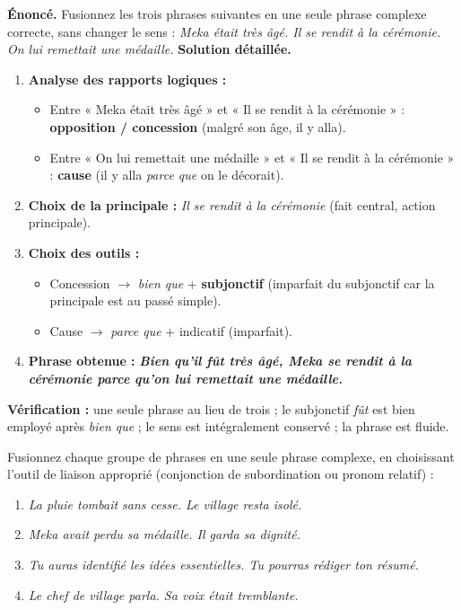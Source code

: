 \documentclass[11pt]{article}
\begin{document}
\begin{exoresolu}
\textbf{Énoncé.} Fusionnez les trois phrases suivantes en une seule phrase complexe correcte, sans changer le sens : \emph{Meka était très âgé. Il se rendit à la cérémonie. On lui remettait une médaille.}
\tcblower
\textbf{Solution détaillée.}
\begin{enumerate}
\item \textbf{Analyse des rapports logiques :}
\begin{itemize}
\item Entre « Meka était très âgé » et « Il se rendit à la cérémonie » : \textbf{opposition / concession} (malgré son âge, il y alla).
\item Entre « On lui remettait une médaille » et « Il se rendit à la cérémonie » : \textbf{cause} (il y alla \emph{parce que} on le décorait).
\end{itemize}
\item \textbf{Choix de la principale :} \emph{Il se rendit à la cérémonie} (fait central, action principale).
\item \textbf{Choix des outils :}
\begin{itemize}
\item Concession $\rightarrow$ \emph{bien que} + \textbf{subjonctif} (imparfait du subjonctif car la principale est au passé simple).
\item Cause $\rightarrow$ \emph{parce que} + indicatif (imparfait).
\end{itemize}
\item \textbf{Phrase obtenue :} \emph{\textbf{Bien qu'il fût très âgé, Meka se rendit à la cérémonie parce qu'on lui remettait une médaille.}}
\end{enumerate}
\textbf{Vérification :} une seule phrase au lieu de trois ; le subjonctif \emph{fût} est bien employé après \emph{bien que} ; le sens est intégralement conservé ; la phrase est fluide.
\end{exoresolu}

\begin{exercice}
Fusionnez chaque groupe de phrases en une seule phrase complexe, en choisissant l'outil de liaison approprié (conjonction de subordination ou pronom relatif) :
\begin{enumerate}
\item \emph{La pluie tombait sans cesse. Le village resta isolé.}
\item \emph{Meka avait perdu sa médaille. Il garda sa dignité.}
\item \emph{Tu auras identifié les idées essentielles. Tu pourras rédiger ton résumé.}
\item \emph{Le chef de village parla. Sa voix était tremblante.}
\end{enumerate}
\end{exercice}
\end{document}
